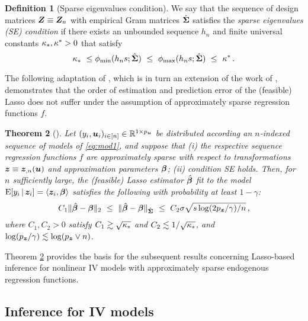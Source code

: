 \documentclass{uwstat572}
\newcommand{\benn}{\begin{equation*}}
\newcommand{\eenn}{\end{equation*}}
\newtheorem{thm}{Theorem}[section]
\theoremstyle{definition}
\newtheorem{defi}[thm]{Definition}
\theoremstyle{remark}
\newcommand{\R}{\ensuremath{\mathbb{R}}}
\newcommand{\Q}{\mathbb{Q}}
\newcommand{\ga}{\alpha}
\newcommand{\gep}{\epsilon}
\newcommand{\gth}{\theta}
\newcommand{\E}{\mathrm{E}}
\newcommand{\bs}[1]{\boldsymbol{#1}}
\numberwithin{equation}{section}
\begin{document}
\begin{defi}[Sparse eigenvalues condition]
We say that the sequence of design matrices $\Z \equiv \Z_n$ with empirical Gram matrices $\gramhat$ satisfies the \emph{sparse eigenvalues (SE) condition} if there exists an unbounded sequence $h_n$ and finite universal constants $\kappa_*, \kappa^* > 0$ that satisfy
\benn
	\cminse \ \leq \minse(h_n s; \gramhat) \ \leq \ \maxse(h_n s; \gramhat) \ \leq \ \cmaxse \,.
\eenn
\end{defi}

The following adaptation of \cite[Theorem 1]{BC13}, which is in turn an extension of the work of \cite{BRT09}, demonstrates that the order of estimation and prediction error of the (feasible) Lasso does not suffer under the assumption of approximately sparse regression functions $f$.

\begin{thm}[{\cite[Theorem 1]{BCH11}}]\label{thm:1}
Let $(y_i, \u_i)_{i\inn} \in \R^{1\times\pu}$ be distributed according an $n$-indexed sequence of models of \eqref{eq:mod1}, and suppose that (i) the respective sequence regression functions $f$ are approximately sparse with respect to transformations $\z \equiv \z_{,n}(\u)$ and approximation parameters $\regb$; (ii) condition SE holds. Then, for $n$ sufficiently large, the (feasible) Lasso estimator $\regbh$ fit to the model $\E[y_i\,|\,\z_i] = \ip{\z_i}{\regb}{}$ satisfies the following with probability at least $1-\gamma$:
\benn
	C_1\|\regbh - \regb\|_2 \ \leq \ \|\regbh-\regb\|_{\gramhat} \ \leq \ C_2 \sd \sqrt{s\log(2\pz/\gamma)/n} \,,
\eenn
where $C_1, C_2 > 0$ satisfy $C_1 \gtrsim \sqrt{\kappa_*}$ and $C_2 \lesssim 1/\sqrt{\kappa_*}$, and $\log(\pz/\gamma) \lesssim \log(\pz\vee n)$. 
\end{thm}

Theorem \ref{thm:1} provides the basis for the subsequent results concerning Lasso-based inference for nonlinear IV models with approximately sparse endogenous regression functions. 


%
%
\subsection{Inference for IV models}
\newcommand{\regt}{\gth}
\newcommand{\regg}{\bs{\gamma}}
\newcommand{\rega}{\bs{\ga}}
\newcommand{\regahat}{\hat{\rega}}
\newcommand{\erfi}{v_i}
\newcommand{\erfc}{v}
\newcommand{\ersc}{\gep}
\newcommand{\sds}{\sd_\ersc}
\newcommand{\sdf}{\sd_\erfc}
\renewcommand{\a}{\bs{a}}
\newcommand{\ahat}{\hat{\a}}
\newcommand{\sdfs}{\sd_{\erfc\ersc}}
\newcommand{\xinst}{\x^\dagger}
\newcommand{\xinsti}{x_i^\dagger}
\newcommand{\ainst}{\a^\dagger}
\newcommand{\ainsti}{\a_i^\dagger}
\newcommand{\ainstihat}{\hat{\a}_i^\dagger}
\newcommand{\ainstihatkpt}{\hat{\a}_i^{\dagger\kpt}}
\newcommand{\ainstikpt}{\a_i^{\dagger\kpt}}
\newcommand{\ainstkpt}{\a^{\dagger\kpt}}
\renewcommand{\rm}{\bs{\Delta}}
\newcommand{\g}{\bs{g}}
\renewcommand{\Q}{\bs{Q}}
\newcommand{\Qn}{\Q_n}
\newcommand{\Qnhat}{\hat{\Q}_n}
\newcommand{\Om}{\bs{\Omega}}
\newcommand{\Omn}{\Om_n}
\newcommand{\EEn}{\bar{\E}}
\newcommand{\regaiv}{\regahat^\dagger}
\newcommand{\sdshat}{\hat{\sds}}
\end{document}
